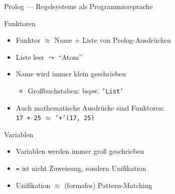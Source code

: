 \documentclass{beamer}
\begin{document}
\begin{frame}{Prolog --- Regelsysteme als Programmiersprache}

  \vfill


\end{frame}

\begin{frame}{Funktoren}

	\begin{itemize}
		\item Funktor $\approx$ Name + Liste von Prolog-Ausdrücken
		\item Liste leer $\leadsto$ \enquote{Atom}
		\item Name wird immer klein geschrieben
		\begin{itemize}
			\item Großbuchstaben: bspw. \texttt{'List'}
		\end{itemize}
                \item Auch mathematische Ausdrücke sind Funktoren:\\
                      \texttt{17 + 25} $\approx$ \texttt{'+'(17, 25)}
	\end{itemize}
\end{frame}

\begin{frame}{Variablen}

	\begin{itemize}
		\item Variablen werden immer groß geschrieben
		\item \texttt{=} ist nicht Zuweisung, sondern Unifikation
		\item Unifikation $\approx$ (formales) Pattern-Matching
	\end{itemize}
\end{frame}
\end{document}
